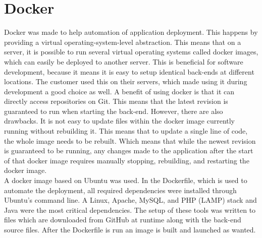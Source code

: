 \section{Docker}
\label{subsec:docker}

Docker \cite{EHW2} was made to help automation of application deployment. This happens by providing a virtual operating-system-level abstraction. This means that on a server, it is possible to run several virtual operating systems called docker images, which can easily be deployed to another server. This is beneficial for software development, because it means it is easy to setup identical back-ends at different locations. The customer used this on their servers, which made using it during development a good choice as well. A benefit of using docker is that it can directly access repositories on Git. This means that the latest revision is guaranteed to run when starting the back-end. However, there are also drawbacks. It is not easy to update files within the docker image currently running without rebuilding it. This means that to update a single line of code, the whole image needs to be rebuilt. Which means that while the newest revision is guaranteed to be running, any changes made to the application after the start of that docker image requires manually stopping, rebuilding, and restarting the docker image. \\

A docker image based on Ubuntu was used. In the Dockerfile, which is used to automate the deployment, all required dependencies were installed through Ubuntu's command line. A Linux, Apache, MySQL, and PHP (LAMP) stack and Java were the most critical dependencies. The setup of these tools was written to files which are downloaded from GitHub at runtime along with the back-end source files. After the Dockerfile is run an image is built and launched as wanted.


\cleardoublepage